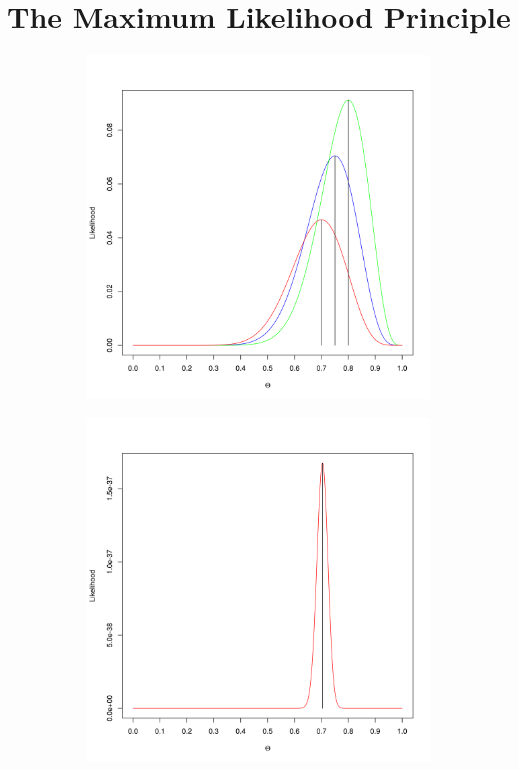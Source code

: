 \section{The Maximum Likelihood Principle}

\begin{figure}
\center
\begin{subfigure}{\textwidth}
\center
\includegraphics[scale=.4]{sparse_likelihood.png}
\caption{}
\label{fig:sparse_likelihood}
\end{subfigure}
\begin{subfigure}{\textwidth}
\center
\includegraphics[scale=.4]{dense_likelihood.png}

\end{subfigure}
\end{figure}
